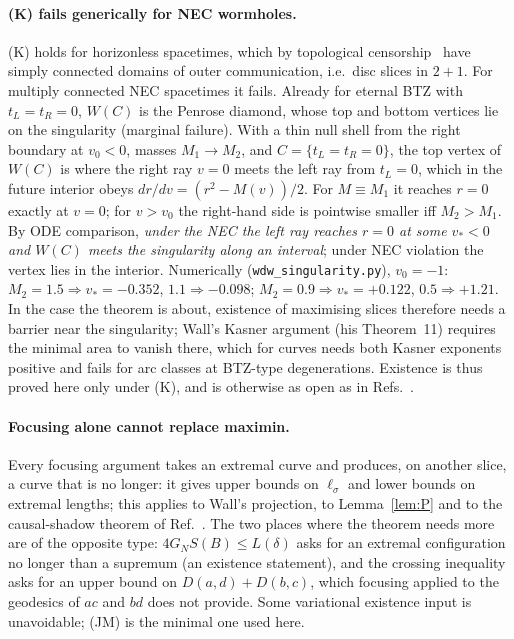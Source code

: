 \documentclass[aps,prd,onecolumn,superscriptaddress,nofootinbib,amsmath,amssymb,11pt]{revtex4-2}
\theoremstyle{definition}
\begin{document}
\paragraph*{(K) fails generically for NEC wormholes.} (K) holds for horizonless spacetimes, which by topological
censorship~\cite{GSWW1999} have simply connected domains of outer communication, i.e.\ disc slices in $2+1$. For multiply connected
NEC spacetimes it fails. Already for eternal BTZ with $t_L=t_R=0$, $W(C)$ is the Penrose diamond, whose top and bottom vertices lie on
the singularity (marginal failure). With a thin null shell from the right boundary at $v_0<0$, masses $M_1\to M_2$, and
$C=\{t_L=t_R=0\}$, the top vertex of $W(C)$ is where the right ray $v=0$ meets the left ray from $t_L=0$, which in the future interior
obeys $dr/dv=(r^2-M(v))/2$. For $M\equiv M_1$ it reaches $r=0$ exactly at $v=0$; for $v>v_0$ the right-hand side is pointwise smaller
iff $M_2>M_1$. By ODE comparison, \emph{under the NEC the left ray reaches $r=0$ at some $v_*<0$ and $W(C)$ meets the singularity along an
interval}; under NEC violation the vertex lies in the interior. Numerically (\texttt{wdw\_singularity.py}), $v_0=-1$:
$M_2=1.5\Rightarrow v_*=-0.352$, $1.1\Rightarrow-0.098$; $M_2=0.9\Rightarrow v_*=+0.122$, $0.5\Rightarrow+1.21$. In the case the theorem is about,
existence of maximising slices therefore needs a barrier near the singularity; Wall's Kasner argument (his Theorem~11) requires the
minimal area to vanish there, which for curves needs both Kasner exponents positive and fails for arc classes at BTZ-type
degenerations. Existence is thus proved here only under (K), and is otherwise as open as in Refs.~\cite{Wall2014,MarolfWallWang2019}.

\paragraph*{Focusing alone cannot replace maximin.} Every focusing argument takes an extremal curve and produces, on another slice, a curve that is no longer: it gives upper
bounds on $\ell_\sigma$ and lower bounds on extremal lengths; this applies to Wall's projection, to Lemma~\ref{lem:P} and to the
causal-shadow theorem of Ref.~\cite{HHLR2014}. The two places where the theorem needs more are of the opposite type:
$4G_NS(B)\le L(\delta)$ asks for an extremal configuration no longer than a supremum (an existence statement), and the crossing
inequality asks for an upper bound on $D(a,d)+D(b,c)$, which focusing applied to the geodesics of $ac$ and $bd$ does not provide. Some
variational existence input is unavoidable; (JM) is the minimal one used here.
\end{document}
